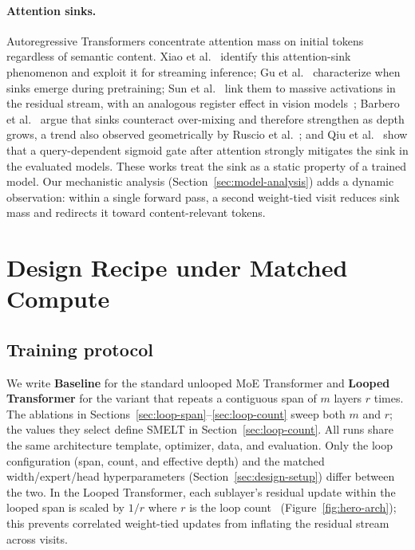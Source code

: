 \documentclass[]{bytedance_seed}
\newcommand{\archname}{SMELT}
\theoremstyle{definition}
\theoremstyle{remark}
\begin{document}
\paragraph{Attention sinks.}
Autoregressive Transformers concentrate attention mass on initial tokens regardless of semantic content.
%
Xiao et al.~\cite{xiao2024streamingllm} identify this attention-sink phenomenon and exploit it for streaming inference; Gu et al.~\cite{gu2025sink} characterize when sinks emerge during pretraining; Sun et al.~\cite{sun2024massive} link them to massive activations in the residual stream, with an analogous register effect in vision models~\cite{darcet2024registers}; Barbero et al.~\cite{barbero2025firsttoken} argue that sinks counteract over-mixing and therefore strengthen as depth grows, a trend also observed geometrically by Ruscio et al.~\cite{ruscio2025sinking}; and Qiu et al.~\cite{qiu2025gated} show that a query-dependent sigmoid gate after attention strongly mitigates the sink in the evaluated models.
%
These works treat the sink as a static property of a trained model.
%
Our mechanistic analysis (Section~\ref{sec:model-analysis}) adds a dynamic observation: within a single forward pass, a second weight-tied visit reduces sink mass and redirects it toward content-relevant tokens.
%
\section{Design Recipe under Matched Compute}
\label{sec:design}

\subsection{Training protocol}
\label{sec:protocol}

We write \textbf{Baseline} for the standard unlooped MoE Transformer and \textbf{Looped Transformer} for the variant that repeats a contiguous span of $m$ layers $r$ times.
%
The ablations in Sections~\ref{sec:loop-span}--\ref{sec:loop-count} sweep both $m$ and $r$; the values they select define \archname{} in Section~\ref{sec:loop-count}.
%
All runs share the same architecture template, optimizer, data, and evaluation.
%
Only the loop configuration (span, count, and effective depth) and the matched width/expert/head hyperparameters (Section~\ref{sec:design-setup}) differ between the two.
%
In the Looped Transformer, each sublayer's residual update within the looped span is scaled by $1/r$ where $r$ is the loop count~\cite{wang2026residual} (Figure~\ref{fig:hero-arch}); this prevents correlated weight-tied updates from inflating the residual stream across visits.
%
\end{document}
